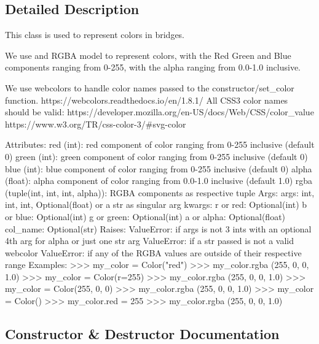 \subsection{Detailed Description}
\begin{DoxyVerb}This class is used to represent colors in bridges.

We use and RGBA model to represent colors, with the Red Green and Blue components ranging from 0-255,
with the alpha ranging from 0.0-1.0 inclusive.

We use webcolors to handle color names passed to the constructor/set_color function.
https://webcolors.readthedocs.io/en/1.8.1/
All CSS3 color names should be valid:
https://developer.mozilla.org/en-US/docs/Web/CSS/color_value
https://www.w3.org/TR/css-color-3/#svg-color

Attributes:
    red (int): red component of color ranging from 0-255 inclusive (default 0)
    green (int): green component of color ranging from 0-255 inclusive (default 0)
    blue (int): blue component of color ranging from 0-255 inclusive (default 0)
    alpha (float): alpha component of color ranging from 0.0-1.0 inclusive (default 1.0)
    rgba (tuple(int, int, int, alpha)): RGBA components as respective tuple
Args:
    args: int, int, int, Optional(float) or a str as singular arg
    kwargs:
        r or red: Optional(int)
        b or blue: Optional(int)
        g or green: Optional(int)
        a or alpha: Optional(float)
        col_name: Optional(str)
Raises:
    ValueError: if args is not 3 ints with an optional 4th arg for alpha or just one str arg
    ValueError: if a str passed is not a valid webcolor
    ValueError: if any of the RGBA values are outside of their respective range
Examples:
    >>> my_color = Color("red")
    >>> my_color.rgba
    (255, 0, 0, 1.0)
    >>> my_color = Color(r=255)
    >>> my_color.rgba
    (255, 0, 0, 1.0)
    >>> my_color = Color(255, 0, 0)
    >>> my_color.rgba
    (255, 0, 0, 1.0)
    >>> my_color = Color()
    >>> my_color.red = 255
    >>> my_color.rgba
    (255, 0, 0, 1.0)
\end{DoxyVerb}
 

\subsection{Constructor \& Destructor Documentation}
\mbox{\label{class_bridges_1_1color_1_1_color_ab66face8abc6657a93f5c0ed05911994}} 
